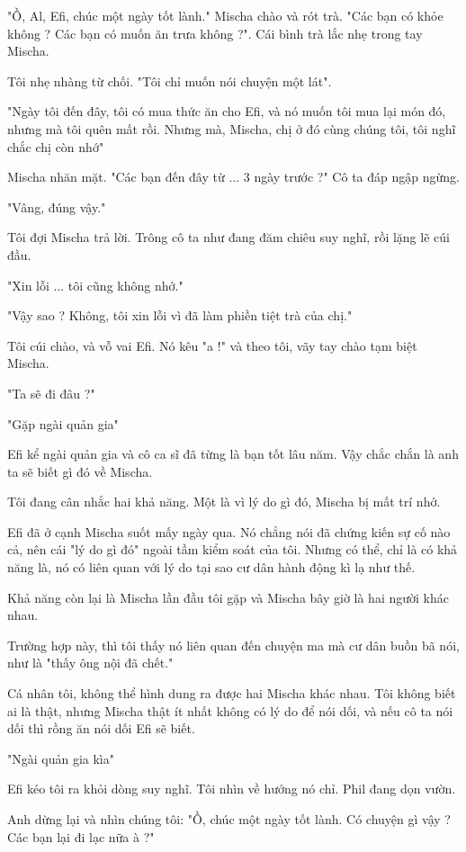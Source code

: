 "Ồ, Al, Efi, chúc một ngày tốt lành." Mischa chào và rót trà. "Các bạn có khỏe không ? Các bạn có muốn ăn trưa không ?". Cái bình trà lắc nhẹ trong tay Mischa.

Tôi nhẹ nhàng từ chối. "Tôi chỉ muốn nói chuyện một lát".

"Ngày tôi đến đây, tôi có mua thức ăn cho Efi, và nó muốn tôi mua lại món đó, nhưng mà tôi quên mất rồi. Nhưng mà, Mischa, chị ở đó cùng chúng tôi, tôi nghĩ chắc chị còn nhớ"

Mischa nhăn mặt. "Các bạn đến đây từ ... 3 ngày trước ?" Cô ta đáp ngập ngừng.

"Vâng, đúng vậy."

Tôi đợi Mischa trả lời. Trông cô ta như đang đăm chiêu suy nghĩ, rồi lặng lẽ cúi đầu.

"Xin lỗi ... tôi cũng không nhớ."

"Vậy sao ? Không, tôi xin lỗi vì đã làm phiền tiệt trà của chị."

Tôi cúi chào, và vỗ vai Efi. Nó kêu "a !" và theo tôi, vãy tay chào tạm biệt Mischa.

"Ta sẽ đi đâu ?"

"Gặp ngài quản gia"

Efi kể ngài quản gia và cô ca sĩ đã từng là bạn tốt lâu năm. Vậy chắc chắn là anh ta sẽ biết gì đó về Mischa.

Tôi đang cân nhắc hai khả năng. Một là vì lý do gì đó, Mischa bị mất trí nhớ.

Efi đã ở cạnh Mischa suốt mấy ngày qua. Nó chẳng nói đã chứng kiến sự cố nào cả, nên cái "lý do gì đó" ngoài tầm kiểm soát của tôi. Nhưng có thể, chỉ là có khả năng là, nó có liên quan với lý do tại sao cư dân hành động kì lạ như thế.

Khả năng còn lại là Mischa lần đầu tôi gặp và Mischa bây giờ là hai người khác nhau.

Trường hợp này, thì tôi thấy nó liên quan đến chuyện ma mà cư dân buồn bã nói, như là "thấy ông nội đã chết."

Cá nhân tôi, không thể hình dung ra được hai Mischa khác nhau. Tôi không biết ai là thật, nhưng Mischa thật ít nhất không có lý do để nói dối, và nếu cô ta nói dối thì rồng ăn nói dối Efi sẽ biết.

"Ngài quản gia kìa"

Efi kéo tôi ra khỏi dòng suy nghĩ. Tôi nhìn về hướng nó chỉ. Phil đang dọn vườn.

Anh dừng lại và nhìn chúng tôi: "Ồ, chúc một ngày tốt lành. Có chuyện gì vậy ? Các bạn lại đi lạc nữa à ?"

